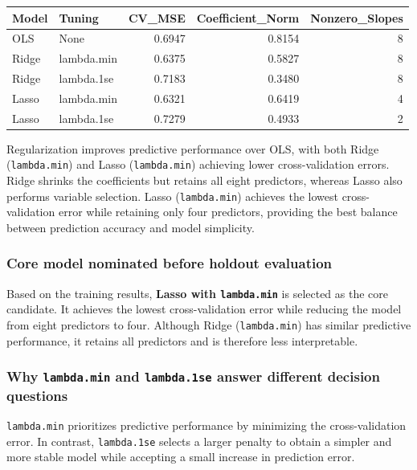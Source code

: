 \documentclass[
  11pt,
]{article}
\newcounter{none} %
\begin{document}
{\def\LTcaptype{none} %
\begin{longtable}[]{@{}llrrr@{}}
\toprule\noalign{}
Model & Tuning & CV\_MSE & Coefficient\_Norm & Nonzero\_Slopes \\
\midrule\noalign{}
\endhead
\bottomrule\noalign{}
\endlastfoot
OLS & None & 0.6947 & 0.8154 & 8 \\
Ridge & lambda.min & 0.6375 & 0.5827 & 8 \\
Ridge & lambda.1se & 0.7183 & 0.3480 & 8 \\
Lasso & lambda.min & 0.6321 & 0.6419 & 4 \\
Lasso & lambda.1se & 0.7279 & 0.4933 & 2 \\
\end{longtable}
}

Regularization improves predictive performance over OLS, with both Ridge
(\texttt{lambda.min}) and Lasso (\texttt{lambda.min}) achieving lower
cross-validation errors. Ridge shrinks the coefficients but retains all
eight predictors, whereas Lasso also performs variable selection. Lasso
(\texttt{lambda.min}) achieves the lowest cross-validation error while
retaining only four predictors, providing the best balance between
prediction accuracy and model simplicity.

\subsubsection{Core model nominated before holdout
evaluation}\label{core-model-nominated-before-holdout-evaluation}

Based on the training results, \textbf{Lasso with \texttt{lambda.min}}
is selected as the core candidate. It achieves the lowest
cross-validation error while reducing the model from eight predictors to
four. Although Ridge (\texttt{lambda.min}) has similar predictive
performance, it retains all predictors and is therefore less
interpretable.

\subsubsection{\texorpdfstring{Why \texttt{lambda.min} and
\texttt{lambda.1se} answer different decision
questions}{Why lambda.min and lambda.1se answer different decision questions}}\label{why-lambda.min-and-lambda.1se-answer-different-decision-questions}

\texttt{lambda.min} prioritizes predictive performance by minimizing the
cross-validation error. In contrast, \texttt{lambda.1se} selects a
larger penalty to obtain a simpler and more stable model while accepting
a small increase in prediction error.
\end{document}
